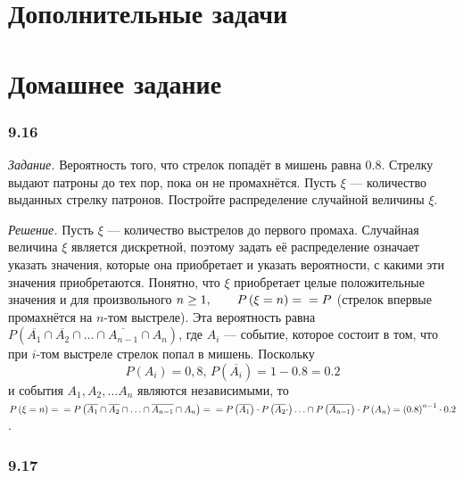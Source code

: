 \section*{Дополнительные задачи}

\section*{Домашнее задание}

\subsubsection*{9.16}

\textit{Задание.} Вероятность того, что стрелок попадёт в мишень равна $0.8$.
Стрелку выдают патроны до тех пор, пока он не промахнётся.
Пусть $ \xi $ --- количество выданных стрелку патронов.
Постройте распределение случайной величины $ \xi $.

\textit{Решение.} Пусть $ \xi $ --- количество выстрелов до первого промаха.
Случайная величина $ \xi $ является дискретной,
поэтому задать её распределение означает указать значения, которые она приобретает и указать вероятности, с какими эти значения приобретаются.
Понятно, что $ \xi $ приобретает целые положительные значения и для произвольного $n \geq 1, \qquad P \left( \xi = n \right) = \\
= P$
(стрелок впервые промахнётся на $n$-том выстреле).
Эта вероятность равна $P \left( \overline{A_1} \cap \overline{A_2} \cap \dotsc \cap \overline{A_{n-1}} \cap A_n \right) $,
где $A_i$ --- событие, которое состоит в том, что при $i$-том выстреле стрелок попал в мишень.
Поскольку
$$P \left( A_i \right) = 0,8, \,
P \left( \overline{A_i} \right) = 1 - 0.8 = 0.2$$
и события $A_1, A_2, \dotsc A_n$ являются независимыми,
то
$P \left( \xi = n \right) = \\
= P \left( \overline{A_1} \cap \overline{A_2} \cap \dotsc \cap \overline{A_{n-1}} \cap A_n \right) = \\
= P \left( \overline{A_1} \right) \cdot P \left( \overline{A_2} \cdot \right) \dotsc \cap P \left( \overline{A_{n-1}} \right) \cdot P \left( A_n \right) =
\left( 0.8 \right)^{n-1} \cdot 0.2$.

\subsubsection*{9.17}

